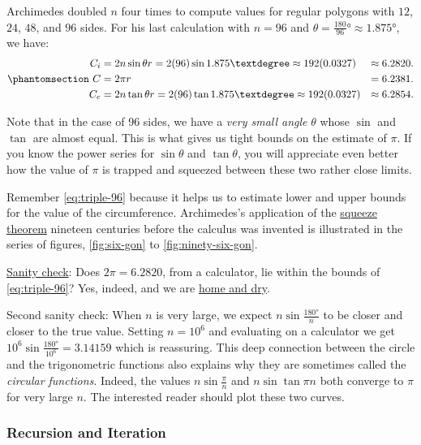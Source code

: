 \documentclass[
  a4paper,
]{article}
\begin{document}
Archimedes doubled \(n\) four times to compute values for regular
polygons with \(12\), \(24\), \(48\), and \(96\) sides. For his last
calculation with \(n = 96\) and
\(\theta = \tfrac{180}{96}° \approx 1.875°\), we have:
\begin{equation}\phantomsection\label{eq:triple-96}{
\begin{aligned}
C_i &= 2n\sin\theta r = 2(96)\sin{1.875°} \approx 192(0.0327) &\approx 6.2820.\\
C &= 2\pi r &= 6.2381.\\
C_c &= 2n\tan\theta r = 2(96)\tan{1.875°} \approx 192(0.0327) &\approx 6.2854.\\
\end{aligned}
}\end{equation}

Note that in the case of 96 sides, we have a \emph{very small angle}
\(\theta\) whose \(\sin\) and \(\tan\) are almost equal. This is what
gives us tight bounds on the estimate of \(\pi\). If you know the power
series for \(\sin\theta\) and \(\tan\theta\), you will appreciate even
better how the value of \(\pi\) is trapped and squeezed between these
two rather close limits.

Remember \cref{eq:triple-96} because it helps us to estimate lower and
upper bounds for the value of the circumference. Archimedes's
application of the
\href{https://en.wikipedia.org/wiki/Squeeze_theorem}{squeeze theorem}
nineteen centuries before the calculus was invented is illustrated in
the series of figures, \cref{fig:six-gon} to \cref{fig:ninety-six-gon}.

\href{https://en.wiktionary.org/wiki/sanity_check}{Sanity check}: Does
\(2\pi = 6.2820\), from a calculator, lie within the bounds of
\cref{eq:triple-96}? Yes, indeed, and we are
\href{https://dictionary.cambridge.org/dictionary/english/be-home-and-dry}{home
and dry}.

Second sanity check: When \(n\) is very large, we expect
\(n\sin\frac{180°}{n}\) to be closer and closer to the true value.
Setting \(n = 10^6\) and evaluating on a calculator we get
\(10^6\sin\frac{180°}{10^6} = 3.14159\) which is reassuring. This deep
connection between the circle and the trigonometric functions also
explains why they are sometimes called the \emph{circular functions}.
Indeed, the values \(n\sin\frac{\pi}{n}\) and \(n\sin\tan{\pi}{n}\) both
converge to \(\pi\) for very large \(n\). The interested reader should
plot these two curves.

\subsubsection{Recursion and Iteration}\label{recursion-and-iteration}
\end{document}
